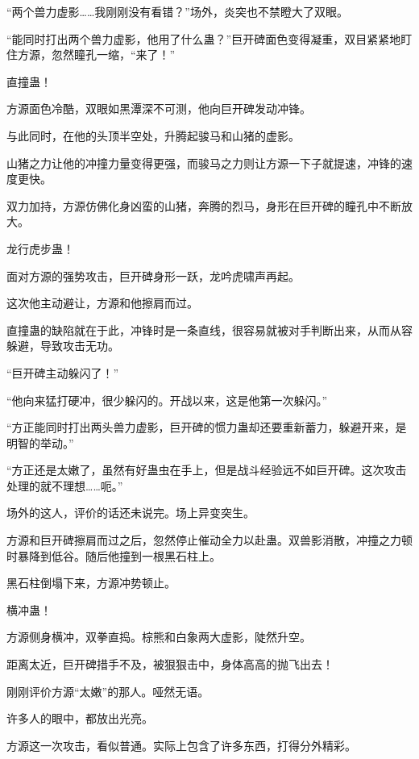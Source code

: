 
\begin{this_body}



“两个兽力虚影……我刚刚没有看错？”场外，炎突也不禁瞪大了双眼。

“能同时打出两个兽力虚影，他用了什么蛊？”巨开碑面色变得凝重，双目紧紧地盯住方源，忽然瞳孔一缩，“来了！”

直撞蛊！

方源面色冷酷，双眼如黑潭深不可测，他向巨开碑发动冲锋。

与此同时，在他的头顶半空处，升腾起骏马和山猪的虚影。

山猪之力让他的冲撞力量变得更强，而骏马之力则让方源一下子就提速，冲锋的速度更快。

双力加持，方源仿佛化身凶蛮的山猪，奔腾的烈马，身形在巨开碑的瞳孔中不断放大。

龙行虎步蛊！

面对方源的强势攻击，巨开碑身形一跃，龙吟虎啸声再起。

这次他主动避让，方源和他擦肩而过。

直撞蛊的缺陷就在于此，冲锋时是一条直线，很容易就被对手判断出来，从而从容躲避，导致攻击无功。

“巨开碑主动躲闪了！”

“他向来猛打硬冲，很少躲闪的。开战以来，这是他第一次躲闪。”

“方正能同时打出两头兽力虚影，巨开碑的惯力蛊却还要重新蓄力，躲避开来，是明智的举动。”

“方正还是太嫩了，虽然有好蛊虫在手上，但是战斗经验远不如巨开碑。这次攻击处理的就不理想……呃。”

场外的这人，评价的话还未说完。场上异变突生。

方源和巨开碑擦肩而过之后，忽然停止催动全力以赴蛊。双兽影消散，冲撞之力顿时暴降到低谷。随后他撞到一根黑石柱上。

黑石柱倒塌下来，方源冲势顿止。

横冲蛊！

方源侧身横冲，双拳直捣。棕熊和白象两大虚影，陡然升空。

距离太近，巨开碑措手不及，被狠狠击中，身体高高的抛飞出去！

刚刚评价方源“太嫩”的那人。哑然无语。

许多人的眼中，都放出光亮。

方源这一次攻击，看似普通。实际上包含了许多东西，打得分外精彩。


\end{this_body}
